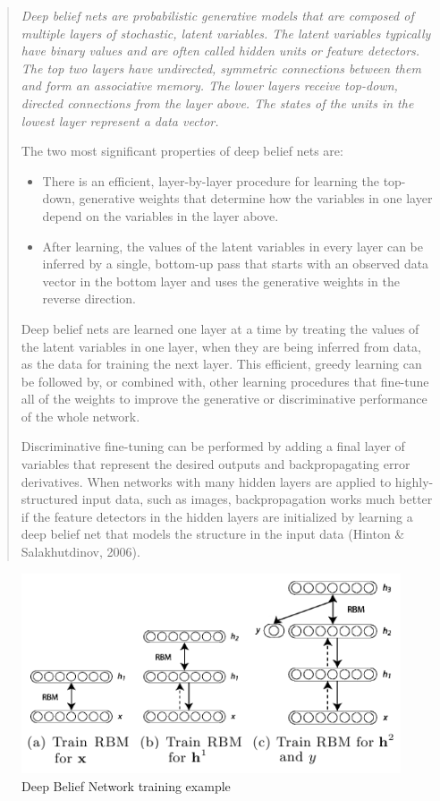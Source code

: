 \documentclass[a4paper,openany,oneside,12pt]{book}
\begin{document}
\begin{quote}
\em Deep belief nets are probabilistic generative models that are composed of multiple layers of stochastic, latent variables. The latent variables typically have binary values and are often called hidden units or feature detectors. The top two layers have undirected, symmetric connections between them and form an associative memory. The lower layers receive top-down, directed connections from the layer above. The states of the units in the lowest layer represent a data vector.

The two most significant properties of deep belief nets are:

\begin{itemize}
\item There is an efficient, layer-by-layer procedure for learning the top-down, generative weights that determine how the variables in one layer depend on the variables in the layer above. 

\item After learning, the values of the latent variables in every layer can be inferred by a single, bottom-up pass that starts with an observed data vector in the bottom layer and uses the generative weights in the reverse direction.
\end{itemize}

Deep belief nets are learned one layer at a time by treating the values of the latent variables in one layer, when they are being inferred from data, as the data for training the next layer. This efficient, greedy learning can be followed by, or combined with, other learning procedures that fine-tune all of the weights to improve the generative or discriminative performance of the whole network.

Discriminative fine-tuning can be performed by adding a final layer of variables that represent the desired outputs and backpropagating error derivatives. When networks with many hidden layers are applied to highly-structured input data, such as images, backpropagation works much better if the feature detectors in the hidden layers are initialized by learning a deep belief net that models the structure in the input data (Hinton \& Salakhutdinov, 2006). \cite{Hinton:2009}
\end{quote}

\begin{figure}
\centering
\includegraphics[width=\textwidth]{img/dbn_model.png} 
\caption{Deep Belief Network training example} \label{fig:dbn}
\end{figure}
\end{document}
